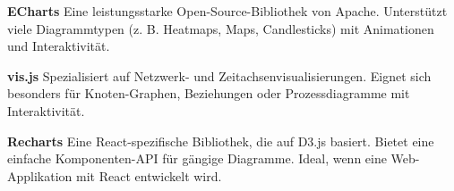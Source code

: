\textbf{ECharts}
Eine leistungsstarke Open-Source-Bibliothek von Apache. Unterstützt viele
Diagrammtypen (z. B. Heatmaps, Maps, Candlesticks) mit Animationen und Interaktivität. \cite{ECharts2025}

\textbf{vis.js}
Spezialisiert auf Netzwerk- und Zeitachsenvisualisierungen. Eignet sich
besonders für Knoten-Graphen, Beziehungen oder Prozessdiagramme mit Interaktivität. \cite{Visjs2025}

\textbf{Recharts}
Eine React-spezifische Bibliothek, die auf D3.js basiert.
Bietet eine einfache Komponenten-API für gängige Diagramme.
Ideal, wenn eine Web-Applikation mit React entwickelt wird. \cite{Recharts2025}













